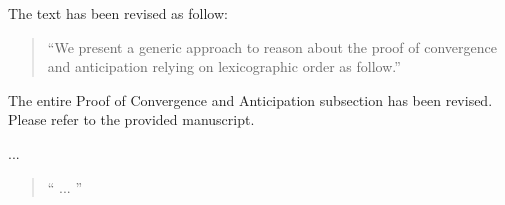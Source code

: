 \documentclass{response}
\begin{document}
\begin{comment}{Reviewer \#1}
• typo. relying on lexicographic order . . .
\end{comment}

\begin{response}
  The text has been revised as follow:
  \begin{quote}
    ``We present a generic approach
    to reason about the proof of convergence and anticipation relying on
    lexicographic order as follow.''
  \end{quote}
\end{response}



\begin{comment}{Reviewer \#1}
• The paragraph Proof of Convergence and Anticipation needs to
be written again. There are many typos: this event removes, discards,
decreases, accroding, . . .
Moreover the sentence
The external events are anticipated accroding to the above variants triv-
ially since they only modify the external queue eQ. Note that we do not
attempt to prove the convergence of any future events here. Instead, we
assume that these future events will be prove to be convergence later.
seems to me problematic. In your definition of anticipated you did not
say that these events should be proven convergent later?
\end{comment}

\begin{response}
  The entire Proof of Convergence and Anticipation subsection has been revised.
  Please refer to the provided manuscript.
\end{response}


\begin{comment}{Reviewer \#1}
• p.25 could you state explicitly your strong fairness property and the
interplay with the temporal properties you are concerned with.
\end{comment}

\begin{response}
  ...
  \begin{quote}
    `` ...
   ''
  \end{quote}
\end{response}


\begin{comment}{Reviewer \#1}
• p.25 A reference to the seminal Unless of Unity could be in order.
\end{comment}
\end{document}
